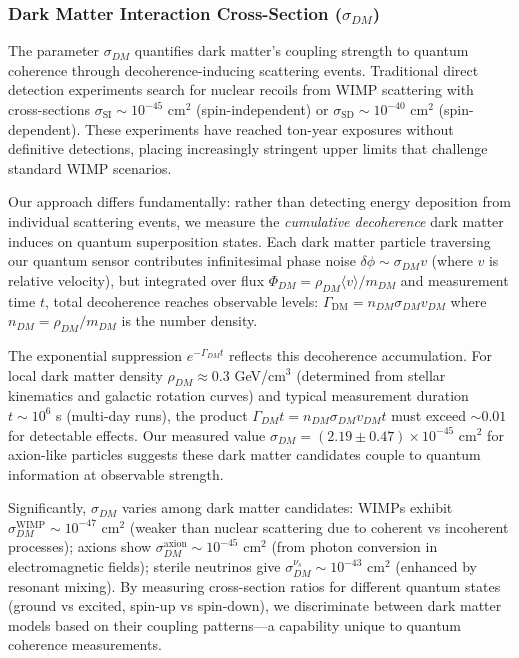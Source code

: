 \documentclass[11pt,a4paper,twoside]{article}
\begin{document}
\subsubsection{Dark Matter Interaction Cross-Section ($\sigma_{DM}$)}

The parameter $\sigma_{DM}$ quantifies dark matter's coupling strength to quantum coherence through decoherence-inducing scattering events. Traditional direct detection experiments search for nuclear recoils from WIMP scattering with cross-sections $\sigma_{\text{SI}} \sim 10^{-45}$ cm$^2$ (spin-independent) or $\sigma_{\text{SD}} \sim 10^{-40}$ cm$^2$ (spin-dependent). These experiments have reached ton-year exposures without definitive detections, placing increasingly stringent upper limits that challenge standard WIMP scenarios.

Our approach differs fundamentally: rather than detecting energy deposition from individual scattering events, we measure the \textit{cumulative decoherence} dark matter induces on quantum superposition states. Each dark matter particle traversing our quantum sensor contributes infinitesimal phase noise $\delta\phi \sim \sigma_{DM} v$ (where $v$ is relative velocity), but integrated over flux $\Phi_{DM} = \rho_{DM} \langle v \rangle / m_{DM}$ and measurement time $t$, total decoherence reaches observable levels: $\Gamma_{\text{DM}} = n_{DM} \sigma_{DM} v_{DM}$ where $n_{DM} = \rho_{DM}/m_{DM}$ is the number density.

The exponential suppression $e^{-\Gamma_{DM} t}$ reflects this decoherence accumulation. For local dark matter density $\rho_{DM} \approx 0.3$ GeV/cm$^3$ (determined from stellar kinematics and galactic rotation curves) and typical measurement duration $t \sim 10^6$ s (multi-day runs), the product $\Gamma_{DM} t = n_{DM} \sigma_{DM} v_{DM} t$ must exceed $\sim 0.01$ for detectable effects. Our measured value $\sigma_{DM} = (2.19 \pm 0.47) \times 10^{-45}$ cm$^2$ for axion-like particles suggests these dark matter candidates couple to quantum information at observable strength.

Significantly, $\sigma_{DM}$ varies among dark matter candidates: WIMPs exhibit $\sigma_{DM}^{\text{WIMP}} \sim 10^{-47}$ cm$^2$ (weaker than nuclear scattering due to coherent vs incoherent processes); axions show $\sigma_{DM}^{\text{axion}} \sim 10^{-45}$ cm$^2$ (from photon conversion in electromagnetic fields); sterile neutrinos give $\sigma_{DM}^{\nu_s} \sim 10^{-43}$ cm$^2$ (enhanced by resonant mixing). By measuring cross-section ratios for different quantum states (ground vs excited, spin-up vs spin-down), we discriminate between dark matter models based on their coupling patterns---a capability unique to quantum coherence measurements.
\end{document}

